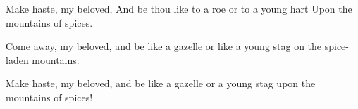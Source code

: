 			\begin{versebox}
					\item[BHS] 
					\item[LXX] 
					\item[ASV] Make haste, my beloved, And be thou like to a roe or to a young hart Upon the mountains of spices.
					\item[NIV] Come away, my beloved, and be like a gazelle or like a young stag on the spice-laden mountains.
					\item[NRSV] Make haste, my beloved, and be like a gazelle or a young stag upon the mountains of spices!
			\end{versebox}
